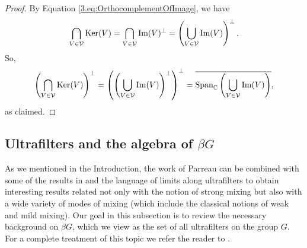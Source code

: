 \documentclass[graybox]{svmult}
\theoremstyle{definition}
\newcommand{\edit}[3]{\color{#1}{#3}\color{black}\marginpar{\textcolor{#1}{[[#2]]}}}
\newcommand{\rz}[1]{\edit{orange}{RZ}{[[#1]]}}
\begin{document}
\begin{proof}
  By Equation \eqref{3.eq:OrthocomplementOfImage}, we have
  $$
\bigcap_{V\in\mathcal V} \text{{\rm Ker}}(V) = \bigcap_{V\in\mathcal V} \text{{\rm Im}}(V)^\perp = \left(\bigcup_{V\in\mathcal V}\text{{\rm Im}}(V)\right)^\perp.
$$
So, 
$$
\left(\bigcap_{V\in\mathcal V} \text{{\rm Ker}}(V)\right)^\perp=\left(\left(\bigcup_{V\in\mathcal V}\text{{\rm Im}}(V)\right)^\perp\right)^\perp=\overline{\text{{\rm Span}}_\mathbb C\left(\bigcup_{V\in\mathcal V}\text{{\rm Im}}(V)\right)},
$$
as claimed. 
\end{proof}
\subsection{Ultrafilters and the algebra of \texorpdfstring{$\beta G$}{beta G}}\label{ssec:Ultrafilters}
As we mentioned in the Introduction, the work of Parreau \cite{ParreauFactor} can be combined with some of the results in \cite{AlmostMixingOfAllOrders} and the language of limits along ultrafilters to obtain interesting results related not only with the notion of  strong mixing  but also with  a wide variety of modes of mixing (which include the classical notions of weak and mild mixing). Our goal in this subsection is to review the necessary background on $\beta G$, which we view as the set of all ultrafilters on the group $G$. 
For a complete treatment of this topic we refer the reader to \cite{HBook}.%
\end{document}

